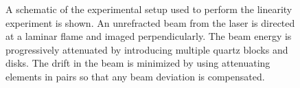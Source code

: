 \begin{figure}
\begin{tikzpicture}
\end{tikzpicture}

\caption[Schematic of the linearity experiment]{A schematic of the experimental setup used to perform the linearity experiment is shown. An unrefracted beam from the laser is directed at a laminar flame and imaged perpendicularly. The beam energy is progressively attenuated by introducing multiple quartz blocks and disks. The drift in the beam is minimized by using attenuating elements in pairs so that any beam deviation is compensated.}

\label{fig:linearityTest}

\end{figure}

